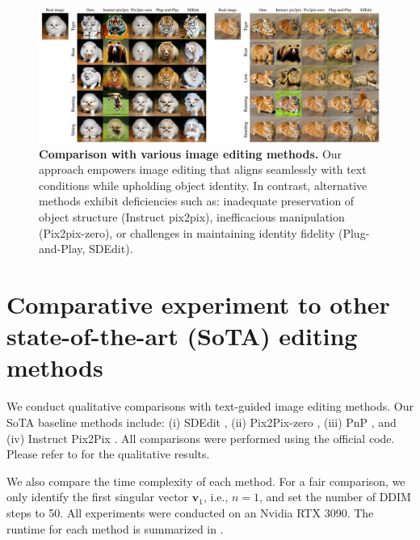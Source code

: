 \begin{figure}[!t]
    \centering
    \includegraphics[width=0.95\linewidth]{figure/comparison_rebuttal.pdf}
    \caption{
    \textbf{Comparison with various image editing methods.}
    Our approach empowers image editing that aligns seamlessly with text conditions while upholding object identity. In contrast, alternative methods exhibit deficiencies such as: inadequate preservation of object structure (Instruct pix2pix), inefficacious manipulation (Pix2pix-zero), or challenges in maintaining identity fidelity (Plug-and-Play, SDEdit).
    }
    \label{fig:comparison}
\end{figure}

\section{Comparative experiment to other state-of-the-art (SoTA) editing methods}
\label{appendix:comparisons}
We conduct qualitative comparisons with text-guided image editing methods. Our SoTA baseline methods include: (i) SDEdit \cite{meng2021sdedit}, (ii) Pix2Pix-zero \cite{parmar2023zero}, (iii) PnP \cite{tumanyan2022plug}, and (iv) Instruct Pix2Pix \cite{brooks2023instructpix2pix}. All comparisons were performed using the official code.
Please refer to  for the qualitative results.

We also compare the time complexity of each method. For a fair comparison, we only identify the first singular vector $\mathbf{v}_1$, i.e., $n=1$, and set the number of DDIM steps to 50. All experiments were conducted on an Nvidia RTX 3090. The runtime for each method is summarized in .

